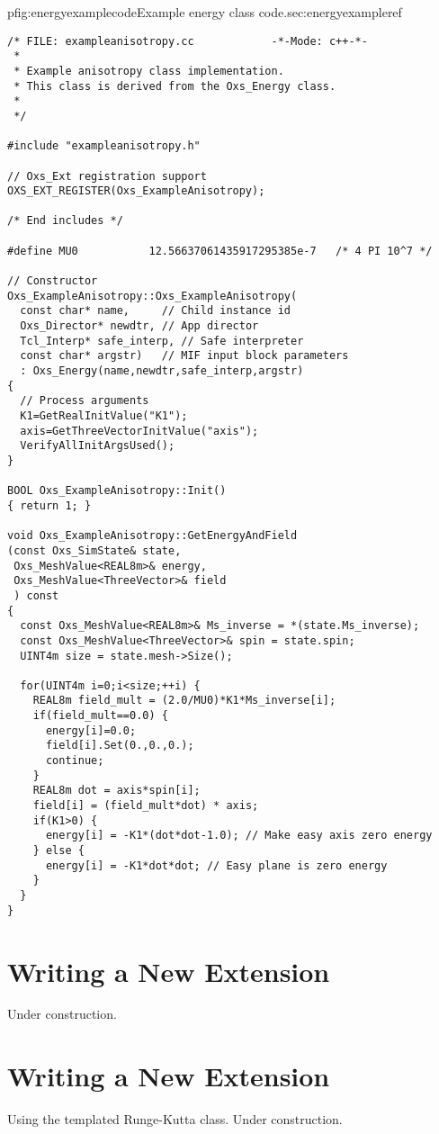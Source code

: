 \begin{codelisting}{p}{fig:energyexamplecode}{Example energy class
code.}{sec:energyexample}{ref}
\begin{verbatim}
/* FILE: exampleanisotropy.cc            -*-Mode: c++-*-
 *
 * Example anisotropy class implementation.
 * This class is derived from the Oxs_Energy class.
 *
 */

#include "exampleanisotropy.h"

// Oxs_Ext registration support
OXS_EXT_REGISTER(Oxs_ExampleAnisotropy);

/* End includes */

#define MU0           12.56637061435917295385e-7   /* 4 PI 10^7 */

// Constructor
Oxs_ExampleAnisotropy::Oxs_ExampleAnisotropy(
  const char* name,     // Child instance id
  Oxs_Director* newdtr, // App director
  Tcl_Interp* safe_interp, // Safe interpreter
  const char* argstr)   // MIF input block parameters
  : Oxs_Energy(name,newdtr,safe_interp,argstr)
{
  // Process arguments
  K1=GetRealInitValue("K1");
  axis=GetThreeVectorInitValue("axis");
  VerifyAllInitArgsUsed();
}

BOOL Oxs_ExampleAnisotropy::Init()
{ return 1; }

void Oxs_ExampleAnisotropy::GetEnergyAndField
(const Oxs_SimState& state,
 Oxs_MeshValue<REAL8m>& energy,
 Oxs_MeshValue<ThreeVector>& field
 ) const
{
  const Oxs_MeshValue<REAL8m>& Ms_inverse = *(state.Ms_inverse);
  const Oxs_MeshValue<ThreeVector>& spin = state.spin;
  UINT4m size = state.mesh->Size();

  for(UINT4m i=0;i<size;++i) {
    REAL8m field_mult = (2.0/MU0)*K1*Ms_inverse[i];
    if(field_mult==0.0) {
      energy[i]=0.0;
      field[i].Set(0.,0.,0.);
      continue;
    }
    REAL8m dot = axis*spin[i];
    field[i] = (field_mult*dot) * axis;
    if(K1>0) {
      energy[i] = -K1*(dot*dot-1.0); // Make easy axis zero energy
    } else {
      energy[i] = -K1*dot*dot; // Easy plane is zero energy
    }
  }
}
\end{verbatim}
\end{codelisting}


\section{Writing a New  Extension}\label{sec:energynew}
Under construction.

\section{Writing a New  Extension}\label{sec:evolvernew}
Using the templated Runge-Kutta class. Under construction.

